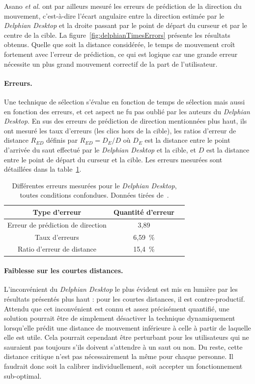 	Asano \emph{et al.} ont par ailleurs mesuré les erreurs de prédiction de la direction du mouvement, c'est-à-dire l'écart angulaire entre la direction estimée par le \emph{Delphian Desktop} et la droite passant par le point de départ du curseur et par le centre de la cible. La figure~\ref{fig:delphianTimesErrors} présente les résultats obtenus. Quelle que soit la distance considérée, le temps de mouvement croît fortement avec l'erreur de prédiction, ce qui est logique car une grande erreur nécessite un plus grand mouvement correctif de la part de l'utilisateur.
	
	\paragraph{Erreurs.}
	Une technique de sélection s'évalue en fonction de temps de sélection mais aussi en fonction des erreurs, et cet aspect ne fu pas oublié par les auteurs du \emph{Delphian Desktop}. En sus des erreurs de prédiction de direction mentionnées plus haut, ils ont mesuré les taux d'erreurs (les clics hors de la cible), les ratios d'erreur de distance $R_{ED}$ définis par $R_{ED} = D_{E}/D$ où $D_{E}$ est la distance entre le point d'arrivée du \og saut \fg{} effectué par le \emph{Delphian Desktop} et la cible, et $D$ est la distance entre le point de départ du curseur et la cible. Les erreurs mesurées sont détaillées dans la table~\ref{tab:delphianErrors}.
	
	\begin{table}
	\centering
	\begin{tabular}{c | c c }
		Type d'erreur						& Quantité d'erreur	\bigstrut[b] \\ \hline
		Erreur de prédiction de direction	& 3,89\textdegree	\bigstrut[t] \\
		Taux d'erreurs						& 6,59~\%{}			\\
		Ratio d'erreur de distance			& 15,4~\%{}			\\
	\end{tabular}
	\caption[\emph{Delphian Desktop} -- erreurs]{Différentes erreurs mesurées pour le \emph{Delphian Desktop}, toutes conditions confondues. Données tirées de~\cite{asano2005predictive}.}
	\label{tab:delphianErrors}
	\end{table}
	
	\paragraph{Faiblesse sur les courtes distances.}
	L'inconvénient du \emph{Delphian Desktop} le plus évident est mis en lumière par les résultats présentés plus haut : pour les courtes distances, il est contre-productif. Attendu que cet inconvénient est connu et assez précisément quantifié, une solution pourrait être de simplement désactiver la technique dynamiquement lorsqu'elle prédit une distance de mouvement inférieure à celle à partir de laquelle elle est utile. Cela pourrait cependant être perturbant pour les utilisateurs qui ne sauraient pas toujours s'ils doivent s'attendre à un \og saut \fg{} ou non. Du reste, cette distance critique n'est pas nécessairement la même pour chaque personne. Il faudrait donc soit la calibrer individuellement, soit accepter un fonctionnement sub-optimal.
	
